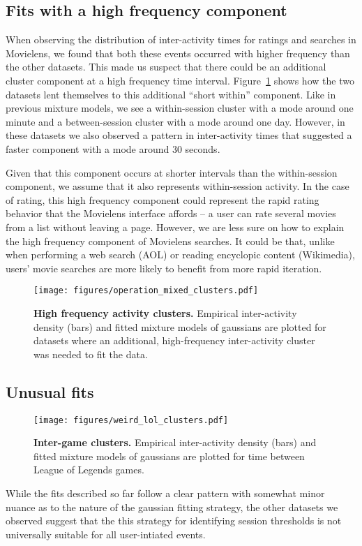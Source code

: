 \subsection{Fits with a high frequency component}
When observing the distribution of inter-activity times for ratings and searches in Movielens, we found that both these events occurred with higher frequency than the other datasets.  This made us suspect that there could be an additional cluster component at a high frequency time interval.  Figure~\ref{fig:operation_mixed_clusters} shows how the two datasets lent themselves to this additional ``short within'' component.  Like in previous mixture models, we see a within-session cluster with a mode around one minute and a between-session cluster with a mode around one day.  However, in these datasets we also observed a pattern in inter-activity times that suggested a faster component with a mode around 30 seconds.

Given that this component occurs at shorter intervals than the within-session component, we assume that it also represents within-session activity.  In the case of rating, this high frequency component could represent the rapid rating behavior that the Movielens interface affords -- a user can rate several movies from a list without leaving a page.  However, we are less sure on how to explain the high frequency component of Movielens searches.  It could be that, unlike when performing a web search (AOL) or reading encyclopic content (Wikimedia), users' movie searches are more likely to benefit from more rapid iteration.
\begin{figure}
\centering
\texttt{[image: figures/operation\_mixed\_clusters.pdf]}
\caption{
    \textbf{High frequency activity clusters.} Empirical inter-activity density (bars) and fitted mixture models of gaussians are plotted for datasets where an additional, high-frequency inter-activity cluster was needed to fit the data.
}
\label{fig:operation_mixed_clusters}
\end{figure}

\subsection{Unusual fits}
\begin{figure}
\centering
\texttt{[image: figures/weird\_lol\_clusters.pdf]}
\caption{
    \textbf{Inter-game clusters.} Empirical inter-activity density (bars) and fitted mixture models of gaussians are plotted for time between League of Legends games.
}
\label{fig:lol_game_clusters}
\end{figure}
While the fits described so far follow a clear pattern with somewhat minor nuance as to the nature of the gaussian fitting strategy, the other datasets we observed suggest that the this strategy for identifying session thresholds is not universally suitable for all user-intiated events.

